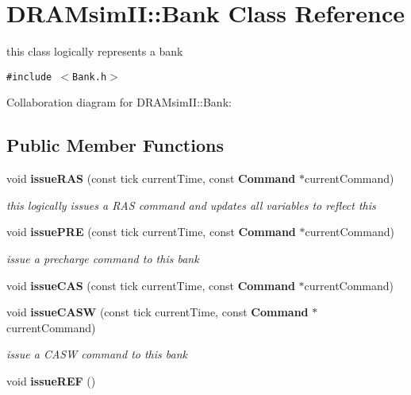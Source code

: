 \section{DRAMsimII::Bank Class Reference}
\label{class_d_r_a_msim_i_i_1_1_bank}
this class logically represents a bank  


{\tt \#include $<$Bank.h$>$}

Collaboration diagram for DRAMsimII::Bank:\subsection*{Public Member Functions}
\begin{CompactItemize}
\item 
void {\bf issueRAS} (const tick currentTime, const {\bf Command} $\ast$currentCommand)\label{class_d_r_a_msim_i_i_1_1_bank_58c189cd77508d1fdf98335554823d97}

\begin{CompactList}\small\item\em this logically issues a RAS command and updates all variables to reflect this \item\end{CompactList}\item 
void {\bf issuePRE} (const tick currentTime, const {\bf Command} $\ast$currentCommand)\label{class_d_r_a_msim_i_i_1_1_bank_6ec29dfb3c6fa9a12be7057ea7878125}

\begin{CompactList}\small\item\em issue a precharge command to this bank \item\end{CompactList}\item 
void {\bf issueCAS} (const tick currentTime, const {\bf Command} $\ast$currentCommand)
\item 
void {\bf issueCASW} (const tick currentTime, const {\bf Command} $\ast$currentCommand)\label{class_d_r_a_msim_i_i_1_1_bank_3db7fb5a6064cde0b141a2adc6547538}

\begin{CompactList}\small\item\em issue a CASW command to this bank \item\end{CompactList}\item 
void {\bf issueREF} ()\label{class_d_r_a_msim_i_i_1_1_bank_e95c270613412c1435c931e30b6860a9}


\end{CompactItemize}
